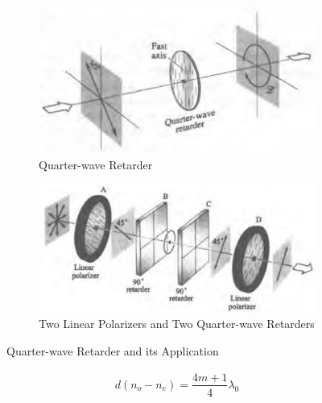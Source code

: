 \begin{figure}[H]
  \centering
  \begin{subfigure}{.45\textwidth}
    \centering
    \includegraphics[width=0.8\linewidth]{figures/Retarder}
    \caption{Quarter-wave Retarder}
  \end{subfigure}
  \begin{subfigure}{.5\textwidth}
    \centering
    \includegraphics[width=0.9\linewidth]{figures/Retarder2}
    \caption{Two Linear Polarizers and Two Quarter-wave Retarders}
  \end{subfigure}
  \caption{Quarter-wave Retarder and its Application}
\end{figure}

\begin{equation*}
  \begin{aligned}
    d \left( n_o - n_e \right) = \dfrac{4 m + 1}{4} \lambda_0 
  \end{aligned}
\end{equation*}

